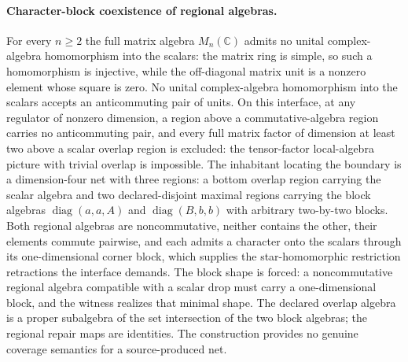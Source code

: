 \documentclass[11pt]{article}
\theoremstyle{remark}
\theoremstyle{plain}
\begin{document}
\paragraph{Character-block coexistence of regional algebras.}
For every \(n\ge 2\) the full matrix algebra \(M_n(\mathbb C)\) admits no unital complex-algebra homomorphism into the scalars: the matrix
ring is simple, so such a homomorphism is injective, while the off-diagonal matrix unit is a nonzero element whose square is zero. No unital
complex-algebra homomorphism into the scalars accepts an anticommuting pair of units. On this interface, at any regulator of nonzero
dimension, a region above a commutative-algebra region carries no anticommuting pair, and every full matrix factor of dimension at least two
above a scalar overlap region is excluded: the tensor-factor local-algebra picture with trivial overlap is impossible. The inhabitant locating the boundary
is a dimension-four net with three regions: a bottom overlap region
carrying the scalar algebra and two declared-disjoint maximal regions
carrying the block algebras \(\operatorname{diag}(a,a,A)\) and
\(\operatorname{diag}(B,b,b)\) with arbitrary two-by-two blocks. Both
regional algebras are noncommutative, neither contains the other, their
elements commute pairwise, and each admits a character onto the scalars
through its one-dimensional corner block, which supplies the
star-homomorphic restriction retractions the interface demands. The block
shape is forced: a noncommutative regional algebra compatible with a
scalar drop must carry a one-dimensional block, and the witness realizes
that minimal shape. The declared overlap algebra is a proper subalgebra of
the set intersection of the two block algebras; the regional repair maps
are identities. The construction provides no genuine coverage semantics for a
source-produced net.
\end{document}
